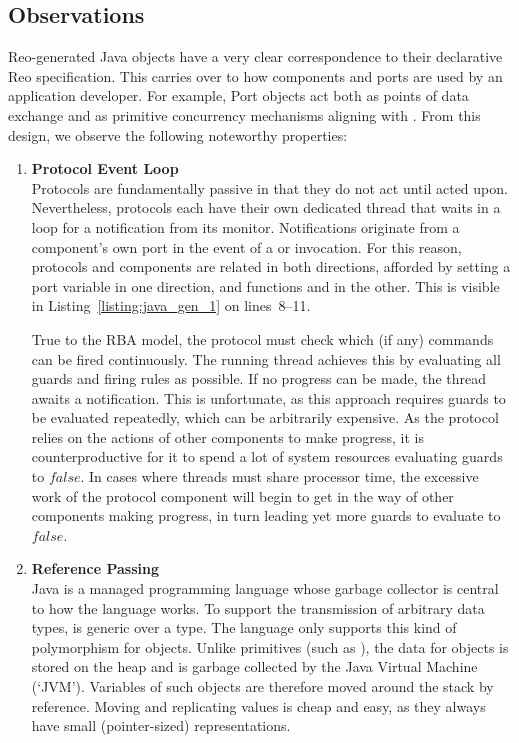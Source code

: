 \subsection{Observations}
\label{sec:java_observations}
Reo-generated Java objects have a very clear correspondence to their declarative Reo specification. This carries over to how components and ports are used by an application developer. For example, Port objects act both as points of data exchange and as primitive concurrency mechanisms aligning  with . From this design, we observe the following noteworthy properties:

\begin{enumerate}
	\item \textbf{Protocol Event Loop}\\
	Protocols are fundamentally passive in that they do not act until acted upon. Nevertheless, protocols each have their own dedicated thread that waits in a loop for a notification from its monitor. Notifications originate from a component's own port in the event of a  or  invocation. For this reason, protocols and components are related in both directions, afforded by setting a port variable in one direction, and functions  and  in the other. This is visible in Listing~\ref{listing:java_gen_1} on lines~8--11.
	
	True to the RBA model, the protocol must check which (if any) commands can be fired continuously. The running thread  achieves this by evaluating all guards and firing rules as possible. If no progress can be made, the thread awaits a notification. This is unfortunate, as this approach requires guards to be evaluated repeatedly, which can be arbitrarily expensive. As the protocol relies on the actions of other components to make progress, it is counterproductive for it to spend a lot of system resources evaluating guards to $false$. In cases where threads must share processor time, the excessive work of the protocol component will begin to get in the way of other components making progress, in turn leading yet more guards to evaluate to $false$.
	
	\item \textbf{Reference Passing}\\
	Java is a managed programming language whose garbage collector is central to how the language works. To support the transmission of arbitrary data types,  is generic over a type. The language only supports this kind of polymorphism for objects. Unlike primitives (such as ), the data for objects is stored on the heap and is garbage collected by the Java Virtual Machine (`JVM'). Variables of such objects are therefore moved around the stack by reference. Moving and replicating values is cheap and easy, as they always have small (pointer-sized) representations.
	

\end{enumerate}
